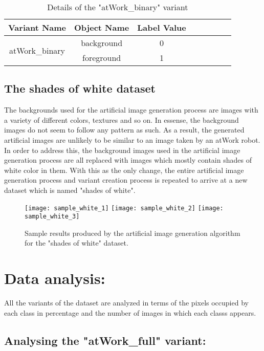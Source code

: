 \documentclass[paper=a4,11pt,parskip=half,toc=listof]{scrartcl}
\begin{document}
\begin{itemize}
		\begin{table}[!htb]
			\centering
			\begin{tabular}{|c|c|c|c|c|c|c|c|}
			\hline 
  			\textbf{Variant Name} & \textbf{Object Name} & \textbf{Label Value} \\ 
			\hline
			\multirow{2}{*}{atWork\_binary} & background & 0 \\ 
			\cline{2-3}%
			 & foreground & 1 \\
			\hline
			\end{tabular}
			\caption{Details of the "atWork\_binary" variant} 
			\label{Table:6}
		\end{table}

	\end{itemize}

	\subsection{The shades of white dataset}
The backgrounds used for the artificial image generation process are images with a variety of different colors, textures and so on. In essense, the background images do not seem to follow any pattern as such. As a result, the generated artificial images are unlikely to be similar to an image taken by an atWork robot. In order to address this, the background images used in the artificial image generation process are all replaced with images which mostly contain shades of white color in them. With this as the only change, the entire artificial image generation process and variant creation process is repeated to arrive at a new dataset which is named "shades of white".

	\begin{figure}[htb!]
		\centering
		\texttt{[image: sample\_white\_1]}
		\texttt{[image: sample\_white\_2]}
		\texttt{[image: sample\_white\_3]}
		\caption{Sample results produced by the artificial image generation algorithm for the "shades of white" dataset.}
		\label{Fig:7}
	\end{figure}
	
\section{Data analysis:}
	All the variants of the dataset are analyzed in terms of the pixels occupied by each class in percentage and the number of images in which each classs appears.
	
	\subsection{Analysing the "atWork\_full" variant:}
		
\end{document}
